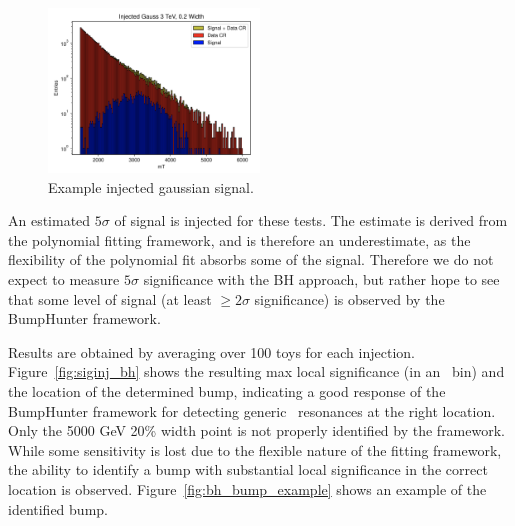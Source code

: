 \begin{figure}[!htbp]
\centering
   \includegraphics[width=0.5\textwidth]{figures/stats/gauss_inj}
    \caption{Example injected gaussian signal.
    \label{fig:gauss_inj}}
\end{figure}


An estimated $5\sigma$ of signal is injected for these tests.
The estimate is derived from the polynomial fitting framework, and is therefore an underestimate, as the flexibility of the polynomial fit absorbs some of the signal.
Therefore we do not expect to measure $5\sigma$ significance with the BH approach, but rather hope to see that some level of signal (at least $\geq2\sigma$ significance)  is observed by the BumpHunter framework. 

Results are obtained by averaging over 100 toys for each injection.
Figure~\ref{fig:siginj_bh} shows the resulting max local significance (in an \mt~bin) and the location of the determined bump, indicating a good response of the BumpHunter framework for detecting generic \mt~resonances at the right location.
Only the 5000 GeV 20\% width point is not properly identified by the framework. 
While some sensitivity is lost due to the flexible nature of the fitting framework, the ability to identify a bump with substantial local significance in the correct location is observed.
Figure~\ref{fig:bh_bump_example} shows an example of the identified bump.

